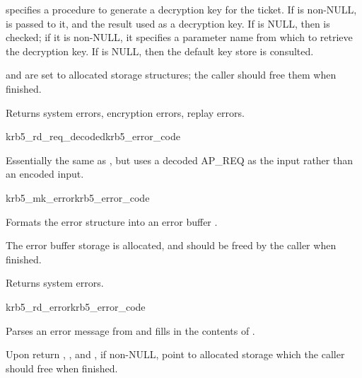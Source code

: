  specifies a procedure to generate a decryption key for the
ticket.  If  is non-NULL,  is
passed to it, and the result used as a decryption key. If
 is NULL, then  is checked; if
it is non-NULL, it specifies a parameter name from which to retrieve the
decryption key.  If  is NULL, then the default key
store is consulted.

 and
 are set to allocated storage
structures; the caller should free them when finished.

Returns system errors, encryption errors, replay errors.

\begin{funcdecl}{krb5_rd_req_decoded}{krb5_error_code}{\funcin}
\funcendfuncarg
{}
\funcout
{}
\end{funcdecl}

Essentially the same as , but uses a decoded AP_REQ
as the input rather than an encoded input.

\begin{funcdecl}{krb5_mk_error}{krb5_error_code}{\funcin}
\funcout
{}
\end{funcdecl}

Formats the error structure  into an error buffer
.

The error buffer storage is allocated, and should be freed by the
caller when finished.

Returns system errors.

\begin{funcdecl}{krb5_rd_error}{krb5_error_code}{\funcin}
\funcout
{}
\end{funcdecl}

Parses an error message from  and fills in the
contents of .

Upon return ,
, and
, if non-NULL, point to allocated
storage which the caller should free when finished.

